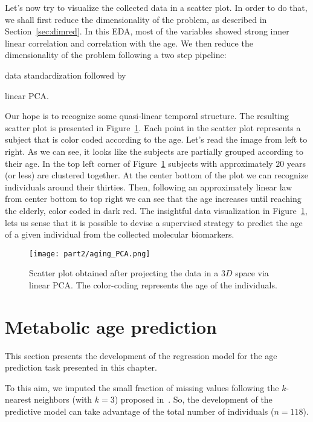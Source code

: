Let's now try to visualize the collected data in a scatter plot. In order to do that, we shall first reduce the dimensionality of the problem, as described in Section~\ref{sec:dimred}.
In this EDA, most of the variables showed strong inner linear correlation and correlation with the age. We then reduce the dimensionality of the problem following a two step pipeline:
\begin{enumerate*}[label=(\roman*)]
	\item data standardization followed by
	\item linear PCA.
\end{enumerate*}
Our hope is to recognize some quasi-linear temporal structure. The resulting scatter plot is presented in Figure~\ref{fig:frassoni_PCA}.
Each point in the scatter plot represents a subject that is color coded according to the age.
Let's read the image from left to right.
As we can see, it looks like the subjects are partially grouped according to their age. In the top left corner of Figure~\ref{fig:frassoni_PCA} subjects with approximately $20$ years (or less) are clustered together. At the center bottom of the plot we can recognize individuals around their thirties. Then, following an approximately linear law from center bottom to top right we can see that the age increases until reaching the elderly, color coded in dark red.
The insightful data visualization in Figure~\ref{fig:frassoni_PCA}, lets us sense that it is possible to devise a supervised strategy to predict the age of a given individual from the collected molecular biomarkers.

\begin{figure}[]
	\centering
	\texttt{[image: part2/aging\_PCA.png]}
	\caption{Scatter plot obtained after projecting the data in a $3D$ space via linear PCA. The color-coding represents the age of the individuals.} \label{fig:frassoni_PCA}
\end{figure}


\section{Metabolic age prediction} \label{sec:frassoni_regression}
This section presents the development of the regression model for the age prediction task presented in this chapter.

To this aim, we imputed the small fraction of missing values following the $k$-nearest neighbors (with $k=3$) proposed in~\cite{troyanskaya2001missing}. So, the development of the predictive model can take advantage of the total number of individuals ($n=118$).

